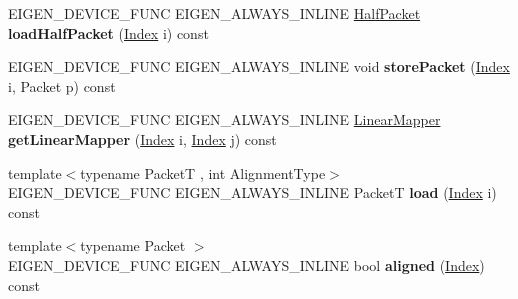 \begin{DoxyCompactItemize}
\item 
\mbox{\label{class_eigen_1_1internal_1_1_tensor_contraction_sub_mapper_ad7cb69f55cab63f938170648de59bd16}} 
E\+I\+G\+E\+N\+\_\+\+D\+E\+V\+I\+C\+E\+\_\+\+F\+U\+NC E\+I\+G\+E\+N\+\_\+\+A\+L\+W\+A\+Y\+S\+\_\+\+I\+N\+L\+I\+NE \hyperlink{union_eigen_1_1internal_1_1_packet}{Half\+Packet} {\bfseries load\+Half\+Packet} (\hyperlink{namespace_eigen_a62e77e0933482dafde8fe197d9a2cfde}{Index} i) const
\item 
\mbox{\label{class_eigen_1_1internal_1_1_tensor_contraction_sub_mapper_a5f24d2073cb4923764b2dae652d7126b}} 
E\+I\+G\+E\+N\+\_\+\+D\+E\+V\+I\+C\+E\+\_\+\+F\+U\+NC E\+I\+G\+E\+N\+\_\+\+A\+L\+W\+A\+Y\+S\+\_\+\+I\+N\+L\+I\+NE void {\bfseries store\+Packet} (\hyperlink{namespace_eigen_a62e77e0933482dafde8fe197d9a2cfde}{Index} i, Packet p) const
\item 
\mbox{\label{class_eigen_1_1internal_1_1_tensor_contraction_sub_mapper_a7f2ae28bdacf3461dc1a3aee4c2e0518}} 
E\+I\+G\+E\+N\+\_\+\+D\+E\+V\+I\+C\+E\+\_\+\+F\+U\+NC E\+I\+G\+E\+N\+\_\+\+A\+L\+W\+A\+Y\+S\+\_\+\+I\+N\+L\+I\+NE \hyperlink{class_eigen_1_1internal_1_1_tensor_contraction_sub_mapper}{Linear\+Mapper} {\bfseries get\+Linear\+Mapper} (\hyperlink{namespace_eigen_a62e77e0933482dafde8fe197d9a2cfde}{Index} i, \hyperlink{namespace_eigen_a62e77e0933482dafde8fe197d9a2cfde}{Index} j) const
\item 
\mbox{\label{class_eigen_1_1internal_1_1_tensor_contraction_sub_mapper_ac52936ea8eca4faf97db62caae9b38bd}} 
{\footnotesize template$<$typename PacketT , int Alignment\+Type$>$ }\\E\+I\+G\+E\+N\+\_\+\+D\+E\+V\+I\+C\+E\+\_\+\+F\+U\+NC E\+I\+G\+E\+N\+\_\+\+A\+L\+W\+A\+Y\+S\+\_\+\+I\+N\+L\+I\+NE PacketT {\bfseries load} (\hyperlink{namespace_eigen_a62e77e0933482dafde8fe197d9a2cfde}{Index} i) const
\item 
\mbox{\label{class_eigen_1_1internal_1_1_tensor_contraction_sub_mapper_a7aee6b68f435d63d760d8be92fa38baa}} 
{\footnotesize template$<$typename Packet $>$ }\\E\+I\+G\+E\+N\+\_\+\+D\+E\+V\+I\+C\+E\+\_\+\+F\+U\+NC E\+I\+G\+E\+N\+\_\+\+A\+L\+W\+A\+Y\+S\+\_\+\+I\+N\+L\+I\+NE bool {\bfseries aligned} (\hyperlink{namespace_eigen_a62e77e0933482dafde8fe197d9a2cfde}{Index}) const

\end{DoxyCompactItemize}
